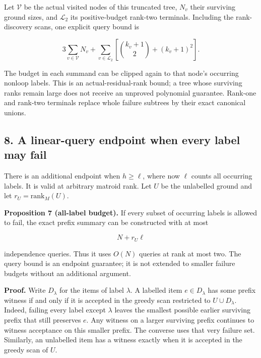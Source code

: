 Let \(\mathcal V\) be the actual visited nodes of this truncated tree, \(N_v\) their surviving ground sizes, and \(\mathcal L_2\) its positive-budget rank-two terminals. Including the rank-discovery scans, one explicit query bound is

\[
3\sum_{v\in\mathcal V}N_v+
\sum_{v\in\mathcal L_2}
\left[\binom{k_v+1}{2}+(k_v+1)^2\right].
\tag{12}
\]

The budget in each summand can be clipped again to that node's occurring nonloop labels. This is an actual-residual-rank bound; a tree whose surviving ranks remain large does not receive an unproved polynomial guarantee. Rank-one and rank-two terminals replace whole failure subtrees by their exact canonical unions.

\hypertarget{af-b41875cb6e-a-linear-query-endpoint-when-every-label-may-fail}{%
\subsection{8. A linear-query endpoint when every label may fail}\label{af-b41875cb6e-a-linear-query-endpoint-when-every-label-may-fail}}

There is an additional endpoint when \(h\ge\ell\), where now \(\ell\) counts all occurring labels. It is valid at arbitrary matroid rank. Let \(U\) be the unlabelled ground and let \(r_U=\mathrm{rank}_M(U)\).

\textbf{Proposition 7 (all-label budget).} If every subset of occurring labels is allowed to fail, the exact prefix summary can be constructed with at most

\[
N+r_U\ell
\tag{13}
\]

independence queries. Thus it uses \(O(N)\) queries at rank at most two. The query bound is an endpoint guarantee; it is not extended to smaller failure budgets without an additional argument.

\textbf{Proof.} Write \(D_\lambda\) for the items of label \(\lambda\). A labelled item \(e\in D_\lambda\) has some prefix witness if and only if it is accepted in the greedy scan restricted to \(U\cup D_\lambda\). Indeed, failing every label except \(\lambda\) leaves the smallest possible earlier surviving prefix that still preserves \(e\). Any witness on a larger surviving prefix continues to witness acceptance on this smaller prefix. The converse uses that very failure set. Similarly, an unlabelled item has a witness exactly when it is accepted in the greedy scan of \(U\).


